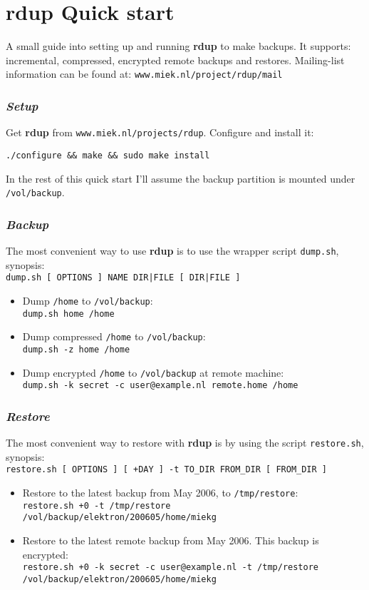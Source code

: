 \documentclass[a4paper, openany]{memoir}
\newcommand{\rdup}{\textbf{rdup}}
\newcommand{\cmd}[1]{\texttt{#1}}
\newcommand{\url}[1]{\texttt{#1}}
\newcommand{\path}[1]{\texttt{#1}}
\begin{document}
\chapter*{\rdup{} Quick start}
A small guide into setting up and running \rdup{} to make backups. It
supports: incremental, compressed, encrypted remote backups and
restores. Mailing-list information can be found at:
\path{www.miek.nl/project/rdup/mail}

\subsection*{\textit{Setup}}
Get \rdup{} from \url{www.miek.nl/projects/rdup}. Configure and install
it:
\begin{verbatim}
./configure && make && sudo make install
\end{verbatim}
In the rest of this quick start I'll assume the backup partition
is mounted under \path{/vol/backup}.

\subsection*{\textit{Backup}}
The most convenient way to use \rdup{} is to use the wrapper
script \cmd{dump.sh}, synopsis:\\
\cmd{dump.sh [ OPTIONS ] NAME DIR|FILE [ DIR|FILE ]}
\begin{itemize}
\item
Dump \path{/home} to \path{/vol/backup}:\\
\cmd{dump.sh home /home} 
\item
Dump compressed \path{/home} to \path{/vol/backup}:\\
\cmd{dump.sh -z home /home} 
\item
Dump encrypted \path{/home} to \path{/vol/backup} at remote
machine:\\
\cmd{dump.sh -k secret -c user@example.nl remote.home /home}
\end{itemize}

\subsection*{\textit{Restore}}
The most convenient way to restore with \rdup{} is by using
the script \cmd{restore.sh}, synopsis:\\
\cmd{restore.sh [ OPTIONS ] [ +DAY ] -t TO\_DIR FROM\_DIR [ FROM\_DIR ]}
\begin{itemize}
\item
Restore to the latest backup from May 2006, to \path{/tmp/restore}:\\
\cmd{restore.sh +0 -t /tmp/restore \\
/vol/backup/elektron/200605/home/miekg}
\item
Restore to the latest remote backup from May 2006. This backup
is encrypted:\\
\cmd{restore.sh +0 -k secret -c user@example.nl -t /tmp/restore \\
/vol/backup/elektron/200605/home/miekg}
\end{itemize}
\end{document}
